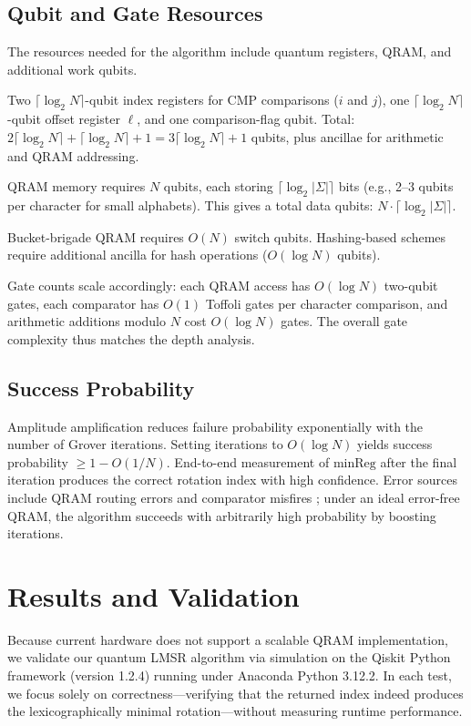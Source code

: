 \documentclass[11pt,letterpaper]{article}
\begin{document}
\subsection{Qubit and Gate Resources}

The resources needed for the algorithm include quantum registers, QRAM, and additional work qubits.

Two \(\lceil \log_2 N\rceil\)-qubit index registers for \(\mathrm{CMP}\) comparisons (\(i\) and \(j\)), one \(\lceil \log_2 N\rceil\)-qubit offset register \(\ell\), and one comparison-flag qubit. Total: \(2\lceil\log_2 N\rceil + \lceil\log_2 N\rceil + 1 = 3\lceil\log_2 N\rceil + 1\) qubits, plus ancillae for arithmetic and QRAM addressing.

QRAM memory requires \(N\)  qubits, each storing \(\lceil \log_2 |\Sigma| \rceil\) bits (e.g., 2--3 qubits per character for small alphabets). This gives a total data qubits: \(N \cdot \lceil \log_2|\Sigma|\rceil\).

Bucket-brigade QRAM requires \(O(N)\) switch qubits. Hashing-based schemes require additional ancilla for hash operations (\(O(\log N)\) qubits).

Gate counts scale accordingly: each QRAM access has \(O(\log N)\) two-qubit gates, each comparator has \(O(1)\) Toffoli gates per character comparison, and arithmetic additions modulo \(N\) cost \(O(\log N)\) gates. The overall gate complexity thus matches the depth analysis.

\subsection{Success Probability}
Amplitude amplification reduces failure probability exponentially with the number of Grover iterations. Setting iterations to \(O(\log N)\) yields success probability \(\ge 1 - O(1/N)\). End-to-end measurement of \(\text{minReg}\) after the final iteration produces the correct rotation index with high confidence. Error sources include QRAM routing errors and comparator misfires \cite{hann2021resilience}; under an ideal error-free QRAM, the algorithm succeeds with arbitrarily high probability by boosting iterations.

\section{Results and Validation}
\label{sec:results}

Because current hardware does not support a scalable QRAM implementation, we validate our quantum LMSR algorithm via simulation on the Qiskit Python framework \cite{qiskit2024} (version 1.2.4) running under Anaconda Python 3.12.2. In each test, we focus solely on correctness---verifying that the returned index indeed produces the lexicographically minimal rotation---without measuring runtime performance.
\end{document}
